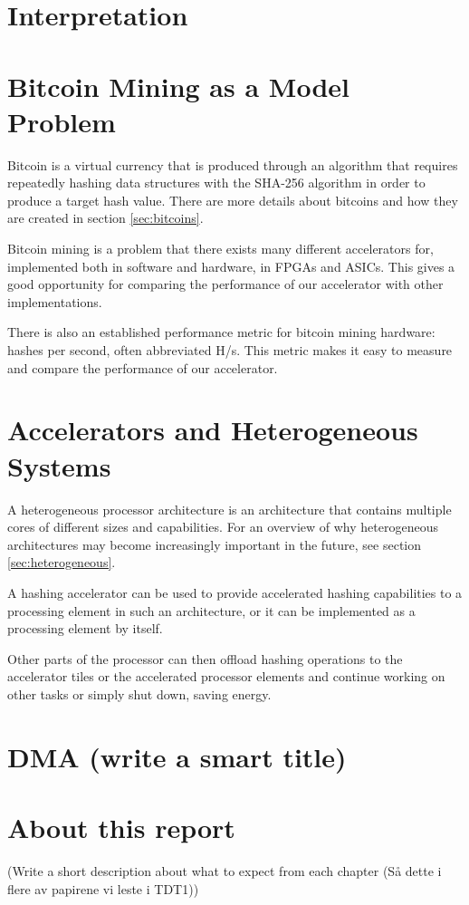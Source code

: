 \section{Interpretation}

\section{Bitcoin Mining as a Model Problem}

Bitcoin is a virtual currency that is produced through an algorithm that
requires repeatedly hashing data structures with the SHA-256 algorithm
in order to produce a target hash value. There are more details about
bitcoins and how they are created in section \ref{sec:bitcoins}.

Bitcoin mining is a problem that there exists many different accelerators
for, implemented both in software and hardware, in FPGAs and ASICs\cite{bespoke-silicon}.
This gives a good opportunity for comparing the performance of our
accelerator with other implementations.

There is also an established performance metric for bitcoin mining hardware:
hashes per second, often abbreviated H/s. This metric makes it easy
to measure and compare the performance of our accelerator.

\section{Accelerators and Heterogeneous Systems}

A heterogeneous processor architecture is an architecture that contains multiple
cores of different sizes and capabilities. For an overview of why heterogeneous
architectures may become increasingly important in the future, see section
\ref{sec:heterogeneous}.

A hashing accelerator can be used to provide accelerated hashing capabilities
to a processing element in such an architecture, or it can be implemented as
a processing element by itself.

Other parts of the processor can then offload hashing operations to the
accelerator tiles or the accelerated processor elements and continue
working on other tasks or simply shut down, saving energy.


\section{DMA (write a smart title)}


\section{About this report}
(Write a short description about what to expect from each chapter (Så dette i flere av papirene vi leste i TDT1))

